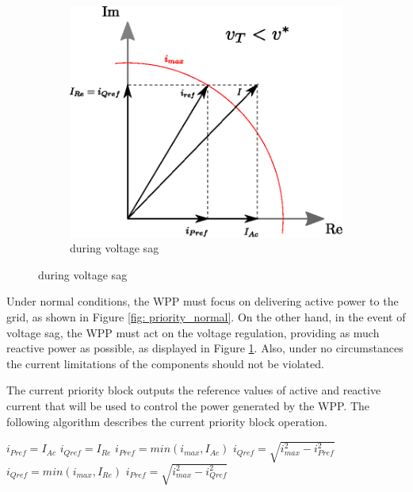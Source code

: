 \begin{figure}[b]
\begin{subfigure}[b]{0.45\textwidth}
    	\includegraphics[width=\textwidth]{Images/priority_block2.eps}
		\caption{during voltage sag}
		\label{fig: priority_sag}
	\end{subfigure}
	\label{fig: CurrentPriority}
\end{figure}

Under normal conditions, the WPP must focus on delivering active power to the grid, as shown in Figure \ref{fig: priority_normal}. On the other hand, in the event of voltage sag, the WPP must act on the voltage regulation, providing as much reactive power as possible, as displayed in Figure \ref{fig: priority_sag}. Also, under no circumstances the current limitations of the components should not be violated.

The current priority block outputs the reference values of active and reactive current that will be used to control the power generated by the WPP. The following algorithm describes the current priority block operation.

\medskip

\begin{algorithmic}
		\STATE $i_{Pref} = I_{Ac}$
		\STATE $i_{Qref} = I_{Re}$
	\ELSE
			\STATE $i_{Pref} = min(i_{max}, I_{Ac})$
			\STATE $i_{Qref} = \sqrt{i_{max}^{2} - i_{Pref}^{2}}$
		\ELSE
			\STATE $i_{Qref} = min(i_{max}, I_{Re})$
			\STATE $i_{Pref} = \sqrt{i_{max}^{2} - i_{Qref}^{2}}$
		\ENDIF
	\ENDIF
\end{algorithmic}


